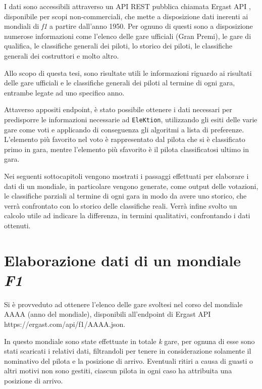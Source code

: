 \documentclass[12pt,a4paper,openright,twoside]{book}
\begin{document}
I dati sono accessibili attraverso un API REST pubblica chiamata Ergast API \cite{WebsiteErgastAPI},
disponibile per scopi non-commerciali,
che mette a disposizione dati inerenti ai mondiali di \textit{\ac{f1}} a partire dall'anno 1950.
Per ognuno di questi sono a disposizione numerose informazioni come l'elenco delle gare ufficiali (Gran Premi),
le gare di qualifica, le classifiche generali dei piloti, lo storico
dei piloti, le classifiche generali dei costruttori e molto altro.

Allo scopo di questa tesi, sono risultate utili le informazioni riguardo ai risultati delle gare ufficiali
e le classifiche generali dei piloti al termine di ogni gara, entrambe legate ad uno specifico anno.

Attaverso appositi endpoint, è stato possibile ottenere i dati necessari per predisporre le informazioni necessarie
ad \texttt{EleKtion}, utilizzando gli esiti delle varie gare come voti e applicando di conseguenza gli algoritmi a lista di preferenze.
L'elemento più favorito nel voto è rappresentato dal pilota che si è classificato primo in gara, mentre l'elemento più sfavorito
è il pilota classificatosi ultimo in gara.

Nei seguenti sottocapitoli vengono mostrati i passaggi effettuati per elaborare i dati di un mondiale,
in particolare vengono generate, come output delle votazioni, le classifiche parziali al termine di ogni gara in modo da avere uno storico,
che verrà confrontato con lo storico delle classifiche reali.
Verrà infine svolto un calcolo utile ad indicare
la differenza, in termini qualitativi, confrontando i dati ottenuti.

\section{Elaborazione dati di un mondiale \textit{F1}}

Si è provveduto ad ottenere l'elenco delle gare svoltesi nel corso del mondiale AAAA (anno del mondiale), disponibili
all'endpoint di Ergast API \newline https://ergast.com/api/f1/AAAA.json.

In questo mondiale sono state effettuate in totale \textit{k} gare, per ognuna di esse sono stati scaricati i relativi
dati, filtrandoli per tenere in considerazione solamente il nominativo del pilota e la posizione di arrivo.
Eventuali ritiri a causa di guasti o altri motivi non sono gestiti, ciascun pilota in ogni caso ha attribuita una posizione di arrivo.
\end{document}
